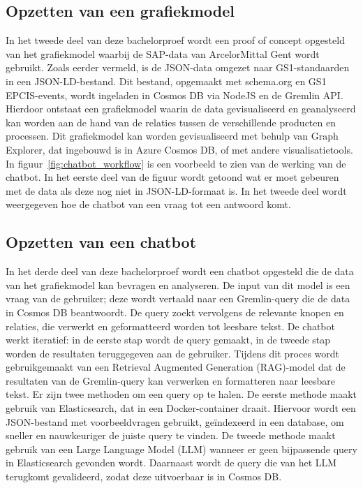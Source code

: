 \subsection{Opzetten van een grafiekmodel}
In het tweede deel van deze bachelorproef wordt een proof of concept opgesteld van het grafiekmodel waarbij de SAP-data van ArcelorMittal Gent wordt gebruikt.
Zoals eerder vermeld, is de JSON-data omgezet naar GS1-standaarden in een JSON-LD-bestand. Dit bestand, opgemaakt met schema.org en GS1 EPCIS-events, wordt ingeladen in Cosmos DB via NodeJS en de Gremlin API.\@
Hierdoor ontstaat een grafiekmodel waarin de data gevisualiseerd en geanalyseerd kan worden aan de hand van de relaties tussen de verschillende producten en processen.
Dit grafiekmodel kan worden gevisualiseerd met behulp van Graph Explorer, dat ingebouwd is in Azure Cosmos DB, of met andere visualisatietools.
In figuur~\ref{fig:chatbot_workflow} is een voorbeeld te zien van de werking van de chatbot.
In het eerste deel van de figuur wordt getoond wat er moet gebeuren met de data als deze nog niet in JSON-LD-formaat is.
In het tweede deel wordt weergegeven hoe de chatbot van een vraag tot een antwoord komt.

\subsection{Opzetten van een chatbot}
In het derde deel van deze bachelorproef wordt een chatbot opgesteld die de data van het grafiekmodel kan bevragen en analyseren.
De input van dit model is een vraag van de gebruiker; deze wordt vertaald naar een Gremlin-query die de data in Cosmos DB beantwoordt.
De query zoekt vervolgens de relevante knopen en relaties, die verwerkt en geformatteerd worden tot leesbare tekst.
De chatbot werkt iteratief: in de eerste stap wordt de query gemaakt, in de tweede stap worden de resultaten teruggegeven aan de gebruiker.
Tijdens dit proces wordt gebruikgemaakt van een Retrieval Augmented Generation (RAG)-model dat de resultaten van de Gremlin-query kan verwerken en formatteren naar leesbare tekst.
Er zijn twee methoden om een query op te halen. De eerste methode maakt gebruik van Elasticsearch, dat in een Docker-container draait.
Hiervoor wordt een JSON-bestand met voorbeeldvragen gebruikt, geïndexeerd in een database, om sneller en nauwkeuriger de juiste query te vinden.
De tweede methode maakt gebruik van een Large Language Model (LLM) wanneer er geen bijpassende query in Elasticsearch gevonden wordt.
Daarnaast wordt de query die van het LLM terugkomt gevalideerd, zodat deze uitvoerbaar is in Cosmos DB.\@

